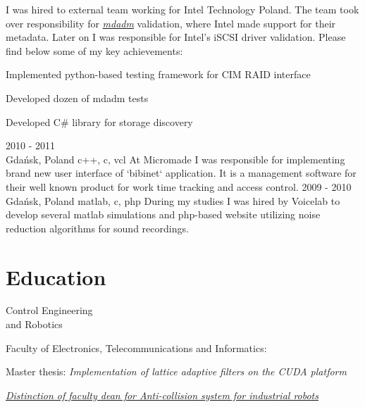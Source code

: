 \documentclass[a4paper,11pt]{cv4tw}%
\begin{document}
      {I was hired to external team working for Intel Technology Poland. The team
        took over responsibility for \href{https://en.wikipedia.org/wiki/Mdadm}{\emph{mdadm}}
        validation, where Intel made support for their metadata. Later on I was
        responsible for Intel's iSCSI driver validation. Please find below some
        of my key achievements:
        \begin{missions}
        \item Implemented python-based testing framework for CIM RAID interface
        \item Developed dozen of mdadm tests
        \item Developed C\# library for storage discovery
        \end{missions}
      }
      {2010 - 2011\\Gdańsk, Poland}
      {c++, c, vcl}
      {At Micromade I was responsible for implementing brand new user interface of `bibinet` application.
        It is a management software for their well known product for work time tracking and access control.
      }
      {2009 - 2010\\Gdańsk, Poland}
      {matlab, c, php}
      {During my studies I was hired by Voicelab to develop several matlab simulations
        and php-based website utilizing noise reduction algorithms for sound recordings.
      }
\section{Education}
      {Control Engineering\\and Robotics}
      {Faculty of Electronics, Telecommunications and Informatics:
        \begin{missions}
          \item Master thesis: \textit{Implementation of lattice adaptive filters on the CUDA platform}
          \item \href{https://projektgrupowy.eti.pg.gda.pl/editions/2/projects/496/posters/138}{\emph{Distinction of faculty dean for \itshape Anti-collision system for industrial robots}}
        \end{missions}
      }
\end{document}
